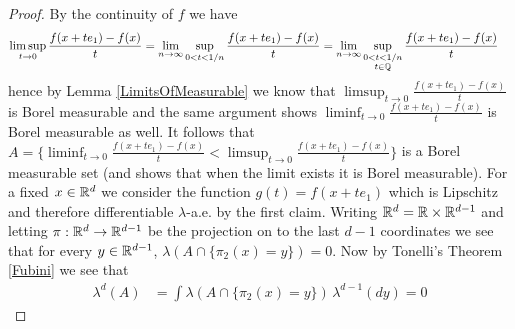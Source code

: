 \begin{proof}
By the continuity of $f$ we have
\begin{align*}
\limsup_{t \to 0} \frac{f(x+te_1) - f(x)}{t} &= \lim_{n \to \infty} \sup_{0 < t < 1/n} \frac{f(x+te_1) - f(x)}{t} = \lim_{n \to \infty} \sup_{\substack{0 < t < 1/n \\ t \in \mathbb{Q}}} \frac{f(x+te_1) - f(x)}{t} 
\end{align*} 
hence by Lemma \ref{LimitsOfMeasurable} we know that $\limsup_{t \to 0} \frac{f(x+te_1) - f(x)}{t}$ is Borel measurable and the same argument shows $\liminf_{t \to 0} \frac{f(x+te_1) - f(x)}{t}$
is Borel measurable as well.  It follows that $A = \lbrace \liminf_{t \to 0} \frac{f(x+te_1) - f(x)}{t} < \limsup_{t \to 0} \frac{f(x+te_1) - f(x)}{t} \rbrace$ is a Borel measurable set (and shows that when the limit exists it is Borel measurable). For a fixed $x \in \mathbb{R}^d$ we consider the function $g(t) = f(x+te_1)$ which is Lipschitz and therefore differentiable $\lambda$-a.e. by the first claim.   Writing $\mathbb{R}^d = \mathbb{R} \times \mathbb{R}^{d-1}$ and letting $\pi : \mathbb{R}^d \to \mathbb{R}^{d-1}$ be the projection on to the last $d-1$ coordinates we see that for every $y \in \mathbb{R}^{d-1}$, $\lambda(A \cap \lbrace \pi_2(x)=y \rbrace) = 0$.  Now by Tonelli's Theorem \ref{Fubini} we see that
\begin{align*}
\lambda^d(A) &= \int \lambda(A \cap \lbrace \pi_2(x)=y \rbrace) \, \lambda^{d-1}(dy) = 0
\end{align*}


\end{proof}
